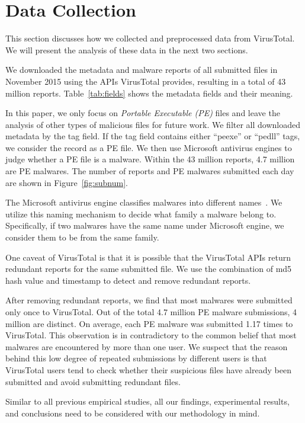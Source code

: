 
\section{Data Collection}
\label{sec:meth}

This section discusses how we collected and preprocessed data from VirusTotal.
We will present the analysis of these data in the next two sections.


We downloaded the metadata and malware reports of all submitted files in November 2015 using the APIs VirusTotal provides,
resulting in a total of 43 million reports.
Table~\ref{tab:fields} shows the metadata fields and their meaning. 

In this paper, we only focus on {\em Portable Executable (PE)} files 
and leave the analysis of other types of malicious files for future work. 
We filter all downloaded metadata by the tag field. 
If the tag field contains either ``peexe'' or ``pedll'' tags, we consider the record as a PE file. 
We then use Microsoft antivirus engines to judge whether a PE file is a malware.
Within the 43 million reports, 4.7 million are PE malwares. 
The number of reports and PE malwares submitted each day are shown in Figure~\ref{fig:subnum}.

The Microsoft antivirus engine classifies malwares into different names~\cite{microsoft}. 
We utilize this naming mechanism to decide what family a malware belong to.
Specifically, if two malwares have the same name under Microsoft engine, we consider them to be from the same family.

One caveat of VirusTotal is that it is possible that the VirusTotal APIs return redundant reports 
for the same submitted file. 
We use the combination of md5 hash value and timestamp to detect and remove redundant reports.

After removing redundant reports, we find that most malwares were submitted only once to VirusTotal. 
Out of the total 4.7 million PE malware submissions, 4 million are distinct. 
On average, each PE malware was submitted 1.17 times to VirusTotal. 
This observation is in contradictory to the common belief that most malwares are encountered by more than one user.
We suspect that the reason behind this low degree of repeated submissions by different users
is that VirusTotal users
tend to check whether their suspicious files have already been submitted
and avoid submitting redundant files.

Similar to all previous empirical studies, all our findings, experimental results, 
and conclusions need to be considered with our methodology in mind. 


